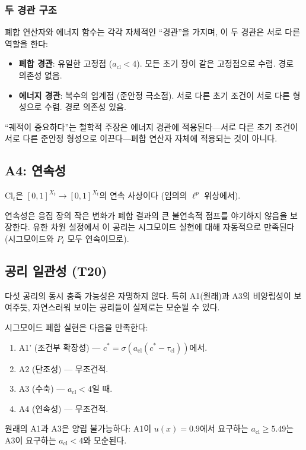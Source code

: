 \subsubsection{두 경관 구조}

폐합 연산자와 에너지 함수는 각각 자체적인 ``경관''을 가지며, 이 두 경관은 서로 다른 역할을 한다:

\begin{tcolorbox}[colback=green!5, colframe=green!50!black, title=두 경관 구조 (Two-Landscape Structure)]
\begin{itemize}
    \item \textbf{폐합 경관}: 유일한 고정점 ($a_{\mathrm{cl}} < 4$). 모든 초기 장이 같은 고정점으로 수렴. 경로 의존성 없음.
    \item \textbf{에너지 경관}: 복수의 임계점 (준안정 극소점). 서로 다른 초기 조건이 서로 다른 형성으로 수렴. 경로 의존성 있음.
\end{itemize}
``궤적이 중요하다''는 철학적 주장은 에너지 경관에 적용된다---서로 다른 초기 조건이 서로 다른 준안정 형성으로 이끈다---폐합 연산자 자체에 적용되는 것이 아니다.
\end{tcolorbox}


\subsection{A4: 연속성}

\begin{axiom}[A4: 연속성]
\label{ax:A4}
$\mathrm{Cl}_t$은 $[0,1]^{X_t} \to [0,1]^{X_t}$의 연속 사상이다 (임의의 $\ell^p$ 위상에서).
\end{axiom}

연속성은 응집 장의 작은 변화가 폐합 결과의 큰 불연속적 점프를 야기하지 않음을 보장한다. 유한 차원 설정에서 이 공리는 시그모이드 실현에 대해 자동적으로 만족된다 (시그모이드와 $P_t$ 모두 연속이므로).


\subsection{공리 일관성 (T20)}

다섯 공리의 동시 충족 가능성은 자명하지 않다. 특히 A1(원래)과 A3의 비양립성이 보여주듯, 자연스러워 보이는 공리들이 실제로는 모순될 수 있다.

\begin{theorem}
\label{thm:T20}
시그모이드 폐합 실현은 다음을 만족한다:
\begin{enumerate}
    \item A1' (조건부 확장성) --- $c^* = \sigma(a_{\mathrm{cl}}(c^* - \tau_{\mathrm{cl}}))$에서.
    \item A2 (단조성) --- 무조건적.
    \item A3 (수축) --- $a_{\mathrm{cl}} < 4$일 때.
    \item A4 (연속성) --- 무조건적.
\end{enumerate}
원래의 A1과 A3은 양립 불가능하다: A1이 $u(x) = 0.9$에서 요구하는 $a_{\mathrm{cl}} \geq 5.49$는 A3이 요구하는 $a_{\mathrm{cl}} < 4$와 모순된다.
\end{theorem}

